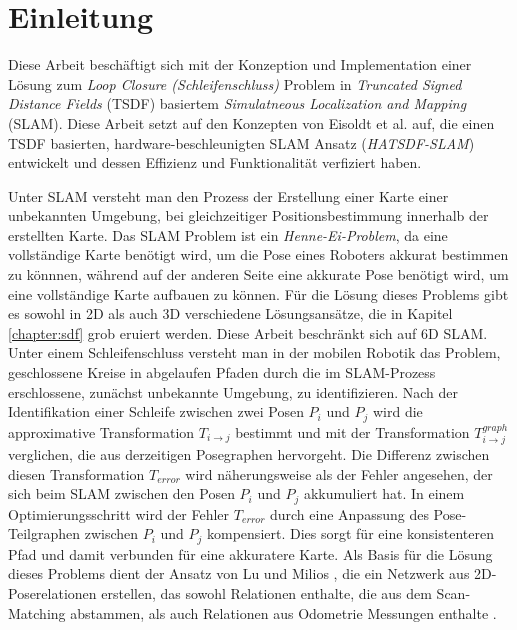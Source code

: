 \chapter{Einleitung}

Diese Arbeit beschäftigt sich mit der Konzeption und Implementation einer Lösung zum \textit{Loop Closure  (Schleifenschluss)} Problem in \textit{Truncated Signed Distance Fields} (TSDF) basiertem \textit{Simulatneous Localization and Mapping} (SLAM).
Diese Arbeit setzt auf den Konzepten von Eisoldt et al. \cite{HATSDF} auf, die einen TSDF basierten, hardware-beschleunigten SLAM Ansatz (\textit{HATSDF-SLAM}) entwickelt und dessen Effizienz und Funktionalität verfiziert haben.

Unter SLAM versteht man den Prozess der Erstellung einer Karte einer unbekannten Umgebung, bei gleichzeitiger Positionsbestimmung innerhalb der erstellten Karte.
Das SLAM Problem ist ein \textit{Henne-Ei-Problem}, da eine vollständige Karte benötigt wird, um die Pose eines Roboters akkurat bestimmen zu könnnen, während auf der anderen Seite eine akkurate Pose benötigt wird, um eine vollständige Karte aufbauen zu können.
Für die Lösung dieses Problems gibt es sowohl in 2D als auch 3D verschiedene Lösungsansätze, die in Kapitel \ref{chapter:sdf} grob eruiert werden.
Diese Arbeit beschränkt sich auf 6D SLAM.
Unter einem Schleifenschluss versteht man in der mobilen Robotik das Problem, geschlossene Kreise in abgelaufen Pfaden durch die im SLAM-Prozess erschlossene, zunächst unbekannte Umgebung, zu identifizieren. Nach der Identifikation einer Schleife zwischen zwei Posen $P_i$ und $P_j$ wird die approximative Transformation $T_{i \rightarrow j}$ bestimmt und mit der Transformation $T_{i \rightarrow j}^{graph}$  verglichen, die aus derzeitigen Posegraphen hervorgeht. Die Differenz zwischen diesen Transformation $T_{error}$ wird näherungsweise als der Fehler angesehen, der sich beim SLAM zwischen den Posen $P_i$ und $P_j$ akkumuliert hat. In einem Optimierungsschritt wird der Fehler $T_{error}$ durch eine Anpassung des Pose-Teilgraphen zwischen $P_i$ und $P_j$ kompensiert. Dies sorgt für eine konsistenteren Pfad und damit verbunden für eine akkuratere Karte. 
Als Basis für die Lösung dieses Problems dient der Ansatz von Lu und Milios \cite{lu1997globally}, die ein Netzwerk aus 2D-Poserelationen erstellen, das sowohl Relationen enthalte, die aus dem Scan-Matching abstammen, als auch Relationen aus Odometrie Messungen enthalte \cite{lu1997globally}. 
